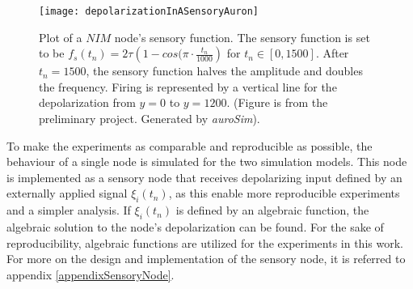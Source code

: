 \begin{figure}[htb!p]
	\centering
	\centerline{ %
	\texttt{[image: depolarizationInASensoryAuron]}
	}
	\caption[The depolarization of a sensory neuron with a sinusoidal algebraic sensory function.]{
			Plot of a $NIM$ node's sensory function.
			The sensory function is set to be $f_s(t_n) = 2\tau\left(1-cos(\pi \cdot \frac{t_n}{1000}\right)$ for $t_n \in [0, 1500]$. After $t_n=1500$, the sensory function halves the amplitude and doubles the frequency.
			Firing is represented by a vertical line for the depolarization from $y=0$ to $y=1200$.
			(Figure is from the preliminary project. Generated by \emph{auroSim}).
			}
\end{figure}


	To make the experiments as comparable and reproducible as possible, the behaviour of a single node is simulated for the two simulation models.
	This node is implemented as a sensory node that receives depolarizing input defined by an externally applied signal $\xi_i(t_n)$, %
		as this enable more reproducible experiments and a simpler analysis.
	If $\xi_i(t_n)$ is defined by an algebraic function, the algebraic solution to the node's depolarization can be found. %
	For the sake of reproducibility, algebraic functions are utilized for the experiments in this work.
	For more on the design and implementation of the sensory node, it is referred to appendix \ref{appendixSensoryNode}.

